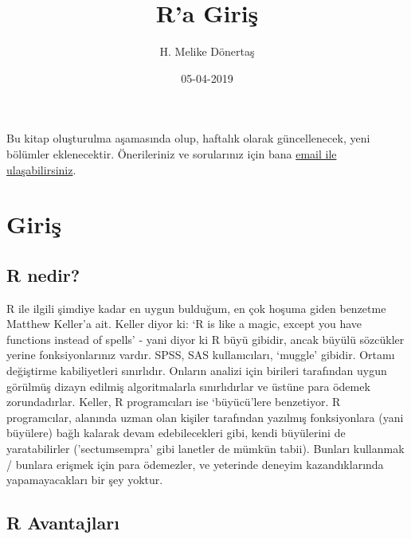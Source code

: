 \documentclass[]{book}
\title{R'a Giriş}
\author{H. Melike Dönertaş}
\date{05-04-2019}
\begin{document}
\maketitle

{
\setcounter{tocdepth}{1}
\tableofcontents
}
\hypertarget{section}{%
\chapter*{}\label{section}}

Bu kitap oluşturulma aşamasında olup, haftalık olarak güncellenecek,
yeni bölümler eklenecektir. Önerileriniz ve sorularınız için bana
\href{mailto:donertas.melike@gmail.com}{email ile ulaşabilirsiniz}.

\hypertarget{Giris}{%
\chapter{Giriş}\label{Giris}}

\hypertarget{r-nedir}{%
\section{R nedir?}\label{r-nedir}}

R ile ilgili şimdiye kadar en uygun bulduğum, en çok hoşuma giden
benzetme Matthew Keller'a ait. Keller diyor ki: `R is like a magic,
except you have functions instead of spells' - yani diyor ki R büyü
gibidir, ancak büyülü sözcükler yerine fonksiyonlarınız vardır. SPSS,
SAS kullanıcıları, `muggle' gibidir. Ortamı değiştirme kabiliyetleri
sınırlıdır. Onların analizi için birileri tarafından uygun görülmüş
dizayn edilmiş algoritmalarla sınırlıdırlar ve üstüne para ödemek
zorundadırlar. Keller, R programcıları ise `büyücü'lere benzetiyor. R
programcılar, alanında uzman olan kişiler tarafından yazılmış
fonksiyonlara (yani büyülere) bağlı kalarak devam edebilecekleri gibi,
kendi büyülerini de yaratabilirler ('sectumsempra' gibi lanetler de
mümkün tabii). Bunları kullanmak / bunlara erişmek için para ödemezler,
ve yeterinde deneyim kazandıklarında yapamayacakları bir şey yoktur.

\hypertarget{r-avantajlar}{%
\section{R Avantajları}\label{r-avantajlar}}
\end{document}
